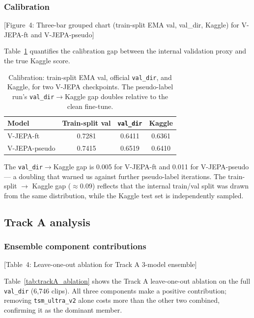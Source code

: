 \documentclass[10pt,twocolumn,letterpaper]{article}
\begin{document}
\subsubsection{Calibration}
\label{sec:calibration}

[Figure~4: Three-bar grouped chart (train-split EMA val, val\_dir, Kaggle)
for V-JEPA-ft and V-JEPA-pseudo]

Table~\ref{tab:calibration} quantifies the calibration gap between the
internal validation proxy and the true Kaggle score.

\begin{table}[!t]
\centering
\caption{Calibration: train-split EMA val, official \texttt{val\_dir},
  and Kaggle, for two V-JEPA checkpoints. The pseudo-label run's
  \texttt{val\_dir}$\to$Kaggle gap doubles relative to the clean fine-tune.}
\label{tab:calibration}
\small
\setlength{\tabcolsep}{3pt}
\begin{tabular}{lccc}
\toprule
\textbf{Model} & \textbf{Train-split val} & \textbf{\texttt{val\_dir}} & \textbf{Kaggle}\\
\midrule
V-JEPA-ft & 0.7281 & 0.6411 & 0.6361\\
V-JEPA-pseudo & 0.7415 & 0.6519 & 0.6410\\
\bottomrule
\end{tabular}
\end{table}

The \texttt{val\_dir}$\to$Kaggle gap is 0.005 for V-JEPA-ft and 0.011 for
V-JEPA-pseudo — a doubling that warned us against further pseudo-label
iterations.  The train-split $\to$ Kaggle gap ($\approx$0.09) reflects
that the internal train/val split was drawn from the same distribution,
while the Kaggle test set is independently sampled.

\subsection{Track A analysis}

\subsubsection{Ensemble component contributions}

[Table~4: Leave-one-out ablation for Track A 3-model ensemble]

Table~\ref{tab:trackA_ablation} shows the Track A leave-one-out ablation on
the full \texttt{val\_dir} (6{,}746 clips).  All three components make a
positive contribution; removing \texttt{tsm\_ultra\_v2} alone costs more
than the other two combined, confirming it as the dominant member.
\end{document}
